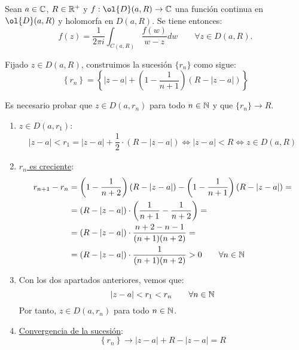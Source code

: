 \begin{ejercicio}\label{ej:7.2}
    Sean $a \in \mathbb{C}$, $R \in \mathbb{R}^+$ y $f : \ol{D}(a,R) \to \bb{C}$ una función continua en $\ol{D}(a,R)$ y holomorfa en $D(a,R)$. Se tiene entonces:
    \[
        f(z) = \frac{1}{2\pi i} \int_{C(a,R)} \frac{f(w)}{w-z}dw \qquad \forall z \in D(a,R).
    \]

    Fijado $z\in D(a,R)$, construimos la sucesión $\{r_n\}$ como sigue:
    \begin{equation*}
        \left\{r_n\right\} = \left\{|z-a|+\left(1-\dfrac{1}{n+1}\right)\left(R-|z-a|\right)\right\}
    \end{equation*}

    Es necesario probar que $z\in D(a,r_n)$ para todo $n\in \mathbb{N}$ y que $\{r_n\}\to R$.
    \begin{enumerate}
        \item \ul{$z\in D(a,r_1)$}:
        \begin{align*}
            |z-a|<r_1=|z-a|+\dfrac{1}{2}\cdot \left(R-|z-a|\right)
            \iff |z-a|<R\iff z\in D(a,R)
        \end{align*}

        \item \ul{$r_n$ es creciente}:
        \begin{align*}
            r_{n+1}-r_n &= \left(1-\dfrac{1}{n+2}\right)\left(R-|z-a|\right) - \left(1-\dfrac{1}{n+1}\right)\left(R-|z-a|\right)=\\
            &= \left(R-|z-a|\right)\cdot\left(\dfrac{1}{n+1}-\dfrac{1}{n+2}\right)=\\
            &= \left(R-|z-a|\right)\cdot\dfrac{n+2-n-1}{(n+1)(n+2)}=\\
            &= \left(R-|z-a|\right)\cdot\dfrac{1}{(n+1)(n+2)}>0\qquad \forall n\in \mathbb{N}
        \end{align*}

        \item Con los dos apartados anteriores, vemos que:
        \begin{equation*}
            |z-a|<r_1<r_n\qquad \forall n\in \mathbb{N}
        \end{equation*}
        Por tanto, $z\in D(a,r_n)$ para todo $n\in \mathbb{N}$.

        \item \ul{Convergencia de la sucesión}:
        \begin{equation*}
            \left\{r_n\right\} \to |z-a| + R - |z-a| = R
        \end{equation*}
    \end{enumerate}


\end{ejercicio}
